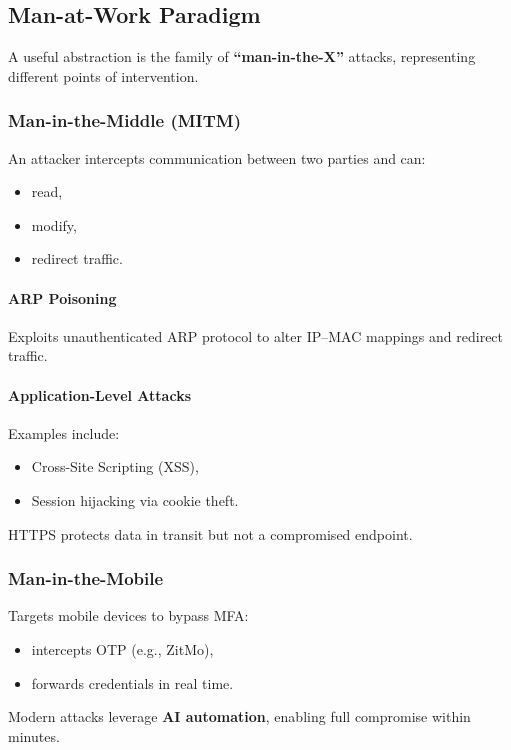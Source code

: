 \subsection{Man-at-Work Paradigm}

A useful abstraction is the family of \textbf{“man-in-the-X”} attacks, representing different points of intervention.

\subsubsection{Man-in-the-Middle (MITM)}

An attacker intercepts communication between two parties and can:
\begin{itemize}
    \item read,
    \item modify,
    \item redirect traffic.
\end{itemize}

\paragraph{ARP Poisoning}
Exploits unauthenticated ARP protocol to alter IP–MAC mappings and redirect traffic.

\paragraph{Application-Level Attacks}
Examples include:
\begin{itemize}
    \item Cross-Site Scripting (XSS),
    \item Session hijacking via cookie theft.
\end{itemize}

\noindent
HTTPS protects data in transit but not a compromised endpoint.

\subsubsection{Man-in-the-Mobile}

Targets mobile devices to bypass MFA:
\begin{itemize}
    \item intercepts OTP (e.g., ZitMo),
    \item forwards credentials in real time.
\end{itemize}

\noindent
Modern attacks leverage \textbf{AI automation}, enabling full compromise within minutes.

